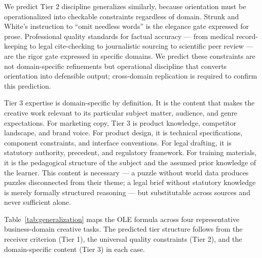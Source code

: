 We predict Tier 2 discipline generalizes similarly, because orientation must be
operationalized into checkable constraints regardless of domain. Strunk and White's
instruction to ``omit needless words'' \cite{strunkwhite} is the elegance gate expressed
for prose. Professional quality standards for factual accuracy --- from medical
record-keeping to legal cite-checking to journalistic sourcing to scientific peer review
--- are the rigor gate expressed in specific domains. We predict these constraints are not
domain-specific refinements but operational discipline that converts orientation into
defensible output; cross-domain replication is required to confirm this prediction.

Tier 3 expertise is domain-specific by definition. It is the content that makes the
creative work relevant to its particular subject matter, audience, and genre expectations.
For marketing copy, Tier 3 is product knowledge, competitor landscape, and brand voice.
For product design, it is technical specifications, component constraints, and interface
conventions. For legal drafting, it is statutory authority, precedent, and regulatory
framework. For training materials, it is the pedagogical structure of the subject and the
assumed prior knowledge of the learner. This content is necessary --- a puzzle without
world data produces puzzles disconnected from their theme; a legal brief without statutory
knowledge is merely formally structured reasoning --- but substitutable across sources
and never sufficient alone.

Table~\ref{tab:generalization} maps the OLE formula across four representative
business-domain creative tasks. The predicted tier structure follows from the receiver
criterion (Tier 1), the universal quality constraints (Tier 2), and the domain-specific
content (Tier 3) in each case.

